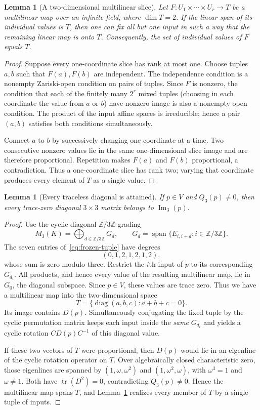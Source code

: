 \documentclass[11pt,reqno]{amsart}
\newtheorem{lemma}[theorem]{Lemma}
\theoremstyle{definition}
\newcommand{\im}{\operatorname{Im}}
\newcommand{\tr}{\operatorname{tr}}
\newcommand{\Span}{\operatorname{span}}
\begin{document}
\begin{lemma}[A two-dimensional multilinear slice]\label{lem:slice}
Let $F:U_1\times\cdots\times U_r\to T$ be a multilinear map over an infinite field, where $\dim T=2$.  If the linear span of its individual values is $T$, then one can fix all but one input in such a way that the remaining linear map is onto $T$.  Consequently, the set of individual values of $F$ equals $T$.
\end{lemma}
\begin{proof}
Suppose every one-coordinate slice has rank at most one.  Choose tuples $a,b$ such that $F(a),F(b)$ are independent.  The independence condition is a nonempty Zariski-open condition on pairs of tuples.  Since $F$ is nonzero, the condition that each of the finitely many $2^r$ mixed tuples (choosing in each coordinate the value from $a$ or $b$) have nonzero image is also a nonempty open condition.  The product of the input affine spaces is irreducible; hence a pair $(a,b)$ satisfies both conditions simultaneously.

Connect $a$ to $b$ by successively changing one coordinate at a time.  Two consecutive nonzero values lie in the same one-dimensional slice image and are therefore proportional.  Repetition makes $F(a)$ and $F(b)$ proportional, a contradiction.  Thus a one-coordinate slice has rank two; varying that coordinate produces every element of $T$ as a single value.
\end{proof}

\begin{lemma}[Every traceless diagonal is attained]\label{lem:diagonal}
If $p\in V$ and $Q_3(p)\ne0$, then every trace-zero diagonal $3\times3$ matrix belongs to $\im_3(p)$.
\end{lemma}
\begin{proof}
Use the cyclic diagonal $\mathbb Z/3\mathbb Z$-grading
\[
 M_3(K)=\bigoplus_{d\in\mathbb Z/3\mathbb Z}G_d,
 \qquad G_d=\Span\{E_{i,i+d}:i\in\mathbb Z/3\mathbb Z\}.
\]
The seven entries of~\eqref{eq:frozen-tuple} have degrees
\[
 (0,1,2,1,2,1,2),
\]
whose sum is zero modulo three.  Restrict the $i$th input of $p$ to its corresponding $G_{d_i}$.  All products, and hence every value of the resulting multilinear map, lie in $G_0$, the diagonal subspace.  Since $p\in V$, these values are trace zero.  Thus we have a multilinear map into the two-dimensional space
\[
 T=\{\operatorname{diag}(a,b,c):a+b+c=0\}.
\]
Its image contains $D(p)$.  Simultaneously conjugating the fixed tuple by the cyclic permutation matrix keeps each input inside the \emph{same} $G_{d_i}$ and yields a cyclic rotation $CD(p)C^{-1}$ of this diagonal value.

If these two vectors of $T$ were proportional, then $D(p)$ would lie in an eigenline of the cyclic rotation operator on $T$.  Over algebraically closed characteristic zero, those eigenlines are spanned by $(1,\omega,\omega^2)$ and $(1,\omega^2,\omega)$, with $\omega^3=1$ and $\omega\ne1$.  Both have $\tr(D^2)=0$, contradicting $Q_3(p)\ne0$.  Hence the multilinear map spans $T$, and Lemma~\ref{lem:slice} realizes every member of $T$ by a single tuple of inputs.
\end{proof}
\end{document}
